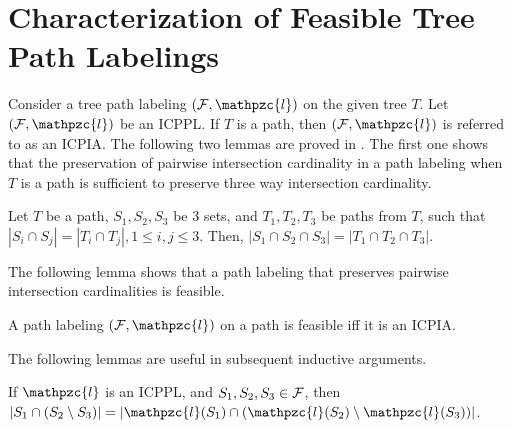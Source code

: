 \documentclass[envcountsect, envcountsame, 11pt]{../lib/llncs2e/llncs}
\def\cF{{\cal F}}
\def\cl{\mathpzc{l}}
\def\icpplpr{Property}
\def\topshrink{0mm} %
\begin{document}
\section{Characterization of Feasible Tree Path  Labelings} \label{sec:feasible} 
Consider a tree path labeling $(\cF, \cl)$ on the
given tree $T$.  Let $(\cF, \cl)$ be an ICPPL. 
%
If $T$ is a path, then $(\cF, \cl)$ is referred to as an ICPIA.
The following two lemmas are proved in \cite{nsnrs09}.  The first one shows that the preservation of pairwise intersection cardinality in a path labeling when $T$ is a path is
sufficient to preserve three way intersection cardinality.
\begin{lemma} \label{lem:intersection-cardinality}
Let $T$ be a path, $S_1, S_2, S_3$ be 3 sets, and $T_1, T_2, T_3$ be paths from $T$, such that $|S_i \cap S_j |=|T_i \cap T_j|, 1 \leq i,j \leq 3$. 
Then, $|S_1 \cap S_2 \cap S_3| = |T_1 \cap T_2 \cap T_3|$.  
\end{lemma}
The following lemma shows that  a path labeling that preserves pairwise intersection cardinalities is feasible.  
\begin{lemma} \label{lem:icpia}
  A path labeling $(\cF, \cl)$ on a path is feasible iff it is an
  ICPIA.
\end{lemma}
The following lemmas are useful in subsequent inductive arguments. 
\begin{lemma}
  \label{lem:setminuscard}
  If $\cl$ is an ICPPL, and $S_1, S_2, S_3 \in \cF$, then $|S_1 \cap
  (S_2 \setminus S_3)| = |\cl(S_1) \cap (\cl(S_2) \setminus
  \cl(S_3))|$.
\end{lemma}
\end{document}
